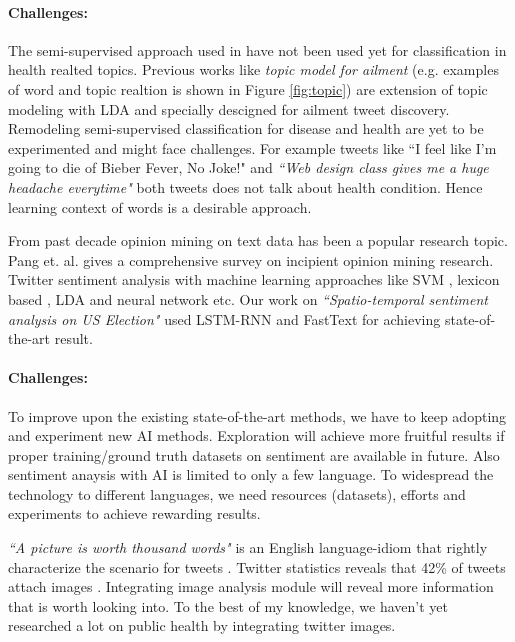 \vspace{-2mm}
\paragraph{Challenges:}
The semi-supervised approach used in \cite{paul2017compass} have not been used yet for classification in health realted topics. Previous works like {\em topic model for ailment} \cite{paul2012model} (e.g. examples of word and topic realtion is shown in  Figure \ref{fig:topic}) are extension of topic modeling with LDA and specially descigned for ailment tweet discovery. Remodeling semi-supervised classification for disease and health are yet to be experimented and might face challenges.
For example tweets like {``I feel like I'm going to die of Bieber Fever, No Joke!"} and  {\em ``Web design class gives me a huge headache everytime"} both tweets does not talk about health condition. Hence learning context of words is a desirable approach.

From past decade opinion mining on text data has been a popular research topic. Pang et. al. \cite{pang2008opinion} gives a comprehensive survey on incipient opinion mining research. Twitter sentiment analysis with machine learning approaches like SVM \cite{joachims1998text}, lexicon based \cite{taboada2011lexicon}, LDA \cite{duric2012feature,kouloumpis2011twitter} and neural network \cite{dos2014deep,tang2015document} etc. Our work on {\em ``Spatio-temporal sentiment analysis on US Election"} used LSTM-RNN {\em } and FastText for achieving state-of-the-art result.

\vspace{-2mm}
\paragraph{Challenges:}
To improve upon the existing state-of-the-art methods, we have to keep adopting and experiment new AI methods. Exploration will achieve more fruitful results if proper training/ground truth datasets on sentiment are available in future. Also sentiment anaysis with AI is limited to only a few language. To widespread the technology to different languages, we need resources (datasets), efforts and experiments to achieve rewarding results.


{\em ``A picture is worth thousand words"}  is an English language-idiom that rightly characterize the scenario for tweets \cite{advice1911syracuse}. Twitter statistics reveals that 42\% of tweets attach images \cite{tweets_images}. Integrating image analysis module will reveal more information that is worth looking into.
To the best of my knowledge, we haven't yet researched a lot on public health by integrating twitter images.

